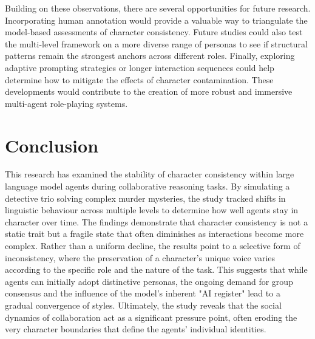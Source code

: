 \documentclass{article}
\begin{document}
Building on these observations, there are several opportunities for future research. Incorporating human annotation would provide a valuable way to triangulate the model-based assessments of character consistency. Future studies could also test the multi-level framework on a more diverse range of personas to see if structural patterns remain the strongest anchors across different roles. Finally, exploring adaptive prompting strategies or longer interaction sequences could help determine how to mitigate the effects of character contamination. These developments would contribute to the creation of more robust and immersive multi-agent role-playing systems.

\section{Conclusion}

This research has examined the stability of character consistency within large language model agents during collaborative reasoning tasks. By simulating a detective trio solving complex murder mysteries, the study tracked shifts in linguistic behaviour across multiple levels to determine how well agents stay in character over time. The findings demonstrate that character consistency is not a static trait but a fragile state that often diminishes as interactions become more complex. Rather than a uniform decline, the results point to a selective form of inconsistency, where the preservation of a character's unique voice varies according to the specific role and the nature of the task. This suggests that while agents can initially adopt distinctive personas, the ongoing demand for group consensus and the influence of the model's inherent "AI register" lead to a gradual convergence of styles. Ultimately, the study reveals that the social dynamics of collaboration act as a significant pressure point, often eroding the very character boundaries that define the agents' individual identities.
\end{document}
